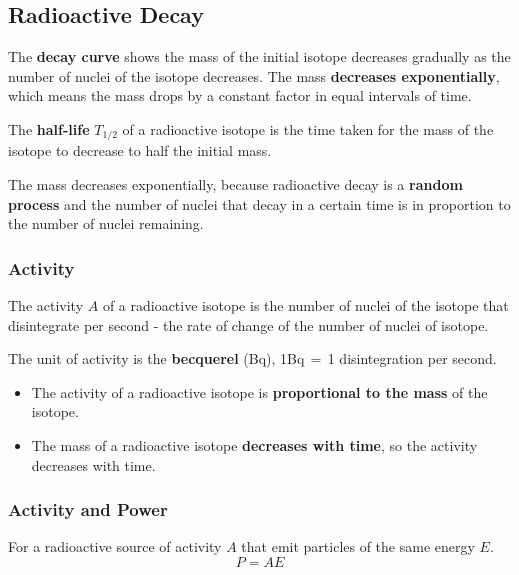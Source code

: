 \subsection{Radioactive Decay}

The \textbf{decay curve} shows the mass of the initial isotope decreases gradually as the number of nuclei of the isotope decreases. The mass \textbf{decreases exponentially}, which means the mass drops by a constant factor in equal intervals of time.

The \textbf{half-life} $T_{1/2}$ of a radioactive isotope is the time taken for the mass of the isotope to decrease to half the initial mass.

The mass decreases exponentially, because radioactive decay is a \textbf{random process} and the number of nuclei that decay in a certain time is in proportion to the number of nuclei remaining.

\subsubsection*{Activity}

The activity $A$ of a radioactive isotope is the number of nuclei of the isotope that disintegrate per second - the rate of change of the number of nuclei of isotope.

The unit of activity is the \textbf{becquerel} (Bq), 1Bq$\,=\,$1 disintegration per second.

\begin{itemize}
    \item The activity of a radioactive isotope is \textbf{proportional to the mass} of the isotope.
    \item The mass of a radioactive isotope \textbf{decreases with time}, so the activity decreases with time.
\end{itemize}

\subsubsection*{Activity and Power}

For a radioactive source of activity $A$ that emit particles of the same energy $E$.
$$P=AE$$
